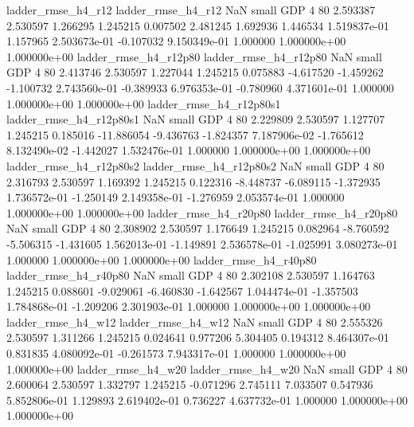       ladder_rmse_h4_r12       ladder_rmse_h4_r12                   NaN      small      GDP                 4 80 2.593387       2.530597 1.266295       1.245215    0.007502      2.481245      1.692936     1.446534   1.519837e-01  1.157965 2.503673e-01    -0.107032   9.150349e-01            1.000000    1.000000e+00        1.000000e+00
   ladder_rmse_h4_r12p80    ladder_rmse_h4_r12p80                   NaN      small      GDP                 4 80 2.413746       2.530597 1.227044       1.245215    0.075883     -4.617520     -1.459262    -1.100732   2.743560e-01 -0.389933 6.976353e-01    -0.780960   4.371601e-01            1.000000    1.000000e+00        1.000000e+00
 ladder_rmse_h4_r12p80s1  ladder_rmse_h4_r12p80s1                   NaN      small      GDP                 4 80 2.229809       2.530597 1.127707       1.245215    0.185016    -11.886054     -9.436763    -1.824357   7.187906e-02 -1.765612 8.132490e-02    -1.442027   1.532476e-01            1.000000    1.000000e+00        1.000000e+00
 ladder_rmse_h4_r12p80s2  ladder_rmse_h4_r12p80s2                   NaN      small      GDP                 4 80 2.316793       2.530597 1.169392       1.245215    0.122316     -8.448737     -6.089115    -1.372935   1.736572e-01 -1.250149 2.149358e-01    -1.276959   2.053574e-01            1.000000    1.000000e+00        1.000000e+00
   ladder_rmse_h4_r20p80    ladder_rmse_h4_r20p80                   NaN      small      GDP                 4 80 2.308902       2.530597 1.176649       1.245215    0.082964     -8.760592     -5.506315    -1.431605   1.562013e-01 -1.149891 2.536578e-01    -1.025991   3.080273e-01            1.000000    1.000000e+00        1.000000e+00
   ladder_rmse_h4_r40p80    ladder_rmse_h4_r40p80                   NaN      small      GDP                 4 80 2.302108       2.530597 1.164763       1.245215    0.088601     -9.029061     -6.460830    -1.642567   1.044474e-01 -1.357503 1.784868e-01    -1.209206   2.301903e-01            1.000000    1.000000e+00        1.000000e+00
      ladder_rmse_h4_w12       ladder_rmse_h4_w12                   NaN      small      GDP                 4 80 2.555326       2.530597 1.311266       1.245215    0.024641      0.977206      5.304405     0.194312   8.464307e-01  0.831835 4.080092e-01    -0.261573   7.943317e-01            1.000000    1.000000e+00        1.000000e+00
      ladder_rmse_h4_w20       ladder_rmse_h4_w20                   NaN      small      GDP                 4 80 2.600064       2.530597 1.332797       1.245215   -0.071296      2.745111      7.033507     0.547936   5.852806e-01  1.129893 2.619402e-01     0.736227   4.637732e-01            1.000000    1.000000e+00        1.000000e+00
